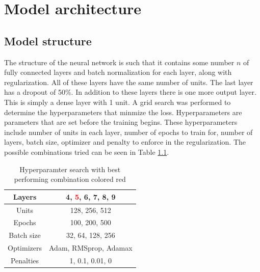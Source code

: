 
\chapter{Model architecture} %

\label{Chapter4} %


\section{Model structure}
The structure of the neural network is such that it contains some number $n$ of fully connected layers and batch normalization for each layer, along with regularization. All of these layers have the same number of units. The last layer has a dropout of 50\%. In addition to these layers there is one more output layer. This is simply a dense layer with 1 unit. A grid search was performed to determine the hyperparameters that minmize the loss. Hyperparameters are parameters that are set before the training begins\cite{hyperparameter_definition}. These hyperparameters include number of units in each layer, number of epochs to train for, number of layers, batch size, optimizer and penalty to enforce in the regularization. The possible combinations tried can be seen in Table \ref{table:gridSearchHyperparamters}.

\begin{table}[h]
    \centering
    \caption{Hyperparamter search with best performing combination colored red}
    \label{table:gridSearchHyperparamters}
    \begin{tabular}{c|c}
        Layers &  4, \textcolor{red}{5}, 6, 7, 8, 9\\\hline
        Units &  128, 256, 512\\\hline
        Epochs & 100, 200, 500\\\hline
        Batch size & 32, 64, 128, 256\\\hline
        Optimizers & Adam, RMSprop, Adamax\\\hline
        Penalties & 1, 0.1, 0.01, 0\\\hline
    \end{tabular}
\end{table}

